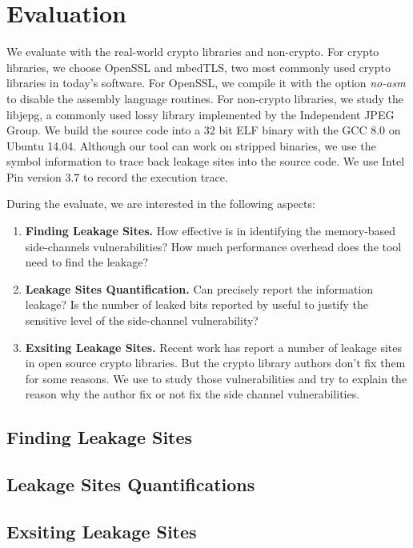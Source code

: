 \section{Evaluation}
We evaluate \tool{} with the real-world crypto libraries and non-crypto. 
For crypto libraries, we choose OpenSSL and mbedTLS, two most commonly used
crypto libraries in today's software. For OpenSSL, we compile it with the option \textit{no-asm} 
to disable the assembly language routines. For non-crypto libraries, 
we study the libjepg, a commonly used lossy library implemented by 
the Independent JPEG Group. We build the source code into a 32 bit 
ELF binary with the GCC 8.0 on Ubuntu 14.04. Although our tool can
work on stripped binaries, we use the symbol information to trace
back leakage sites into the source code. We use Intel Pin version 3.7 
to record the execution trace.

During the evaluate, we are interested in the following aspects:
\begin{enumerate}
    \item \textbf{Finding Leakage Sites.} How effective is \tool{} in 
    identifying the memory-based side-channels vulnerabilities?
    How much performance overhead does the tool need to find the 
    leakage?
    \item \textbf{Leakage Sites Quantification.} Can \tool{} precisely
    report the information leakage? Is the number of leaked bits reported 
    by \tool{} useful to justify the sensitive level of the side-channel
    vulnerability?
    \item \textbf{Exsiting Leakage Sites.} Recent work has report a number
    of leakage sites in open source crypto libraries. But the crypto
    library authors don't fix them for some reasons. We use \tool{} to
    study those vulnerabilities and try to explain the reason why the 
    author fix or not fix the side channel vulnerabilities.
\end{enumerate}

\subsection{Finding Leakage Sites}
\subsection{Leakage Sites Quantifications}
\subsection{Exsiting Leakage Sites}
